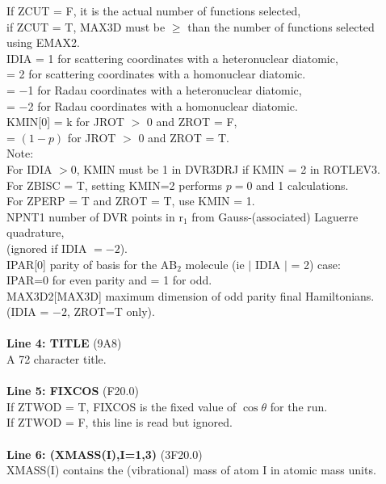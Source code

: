 \documentclass{elsart}
\begin{document}
\begin{tabbing}
      \> If ZCUT = F, it is the actual number of functions selected,\\
      \> if ZCUT = T, MAX3D must be $\geq$ than the number of functions
selected \\
\> using EMAX2.\\
IDIA \> = 1 for scattering coordinates with a heteronuclear diatomic, \\
\> = 2 for scattering coordinates with a homonuclear diatomic. \\
\> = $-$1 for Radau  coordinates with a heteronuclear diatomic, \\
\> = $-$2 for Radau  coordinates with a homonuclear diatomic. \\
KMIN[0]\> = k for JROT $>$ 0 and ZROT = F,\\
\> = $(1 - p)$ for JROT $>$ 0 and ZROT = T. \\
\> Note:\\
\> For IDIA $ > 0$, KMIN must be 1 in DVR3DRJ if KMIN = 2 in ROTLEV3.\\
\> For ZBISC = T, setting KMIN=2 performs  $p = 0$ and 1 calculations.\\
\> For ZPERP = T and ZROT = T, use KMIN = 1.\\
NPNT1 \> number of DVR points in r$_1$ from Gauss-(associated) Laguerre
quadrature, \\
      \> (ignored if IDIA $= -2$).\\
IPAR[0] \> parity of basis for the AB$_2$ molecule (ie $\mid$ IDIA $\mid$ = 2) case:\\
        \> IPAR=0 for even parity and = 1 for odd.\\
MAX3D2[MAX3D] maximum dimension of odd parity final Hamiltonians.\\
        \> (IDIA = $-2$,  ZROT=T only).\\
\\
{\bf Line 4: TITLE} (9A8) \\
A 72 character title.\\
\\
{\bf Line 5: FIXCOS} (F20.0) \\
If ZTWOD = T, FIXCOS is the fixed value of $\cos\theta$ for the run.\\
If ZTWOD = F, this line is read but ignored.\\
\\
{\bf Line 6: (XMASS(I),I=1,3)} (3F20.0)\\
XMASS(I) \> contains the (vibrational) mass of atom I in atomic mass units. \\

\end{tabbing}
\end{document}
